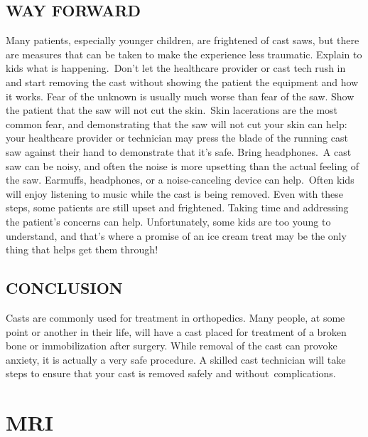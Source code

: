 \documentclass[12pt]{article}
\begin{document}
\subsection{WAY FORWARD}
Many patients, especially younger children, are frightened of cast saws, but there are measures that can be taken to make the experience less traumatic.
Explain to kids what is happening. Don't let the healthcare provider or cast tech rush in and start removing the cast without showing the patient the equipment and how it works. Fear of the unknown is usually much worse than fear of the saw.
Show the patient that the saw will not cut the skin. Skin lacerations are the most common fear, and demonstrating that the saw will not cut your skin can help: your healthcare provider or technician may press the blade of the running cast saw against their hand to demonstrate that it's safe.
Bring headphones. A cast saw can be noisy, and often the noise is more upsetting than the actual feeling of the saw. Earmuffs, headphones, or a noise-canceling device can help. Often kids will enjoy listening to music while the cast is being removed.
Even with these steps, some patients are still upset and frightened. Taking time and addressing the patient's concerns can help. Unfortunately, some kids are too young to understand, and that's where a promise of an ice cream treat may be the only thing that helps get them through!



\subsection{CONCLUSION}
Casts are commonly used for treatment in orthopedics. Many people, at some point or another in their life, will have a cast placed for treatment of a broken bone or immobilization after surgery. While removal of the cast can provoke anxiety, it is actually a very safe procedure. A skilled cast technician will take steps to ensure that your cast is removed safely and without complications.


\section{MRI}
\end{document}
